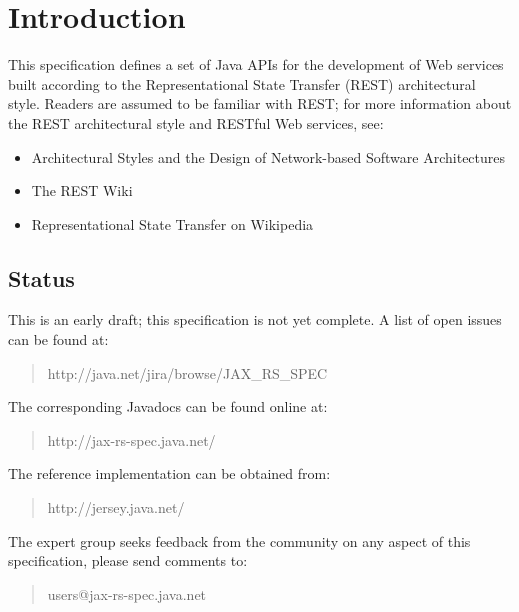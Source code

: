 \chapter{Introduction}

This specification defines a set of Java APIs for the development of Web services built according to the Representational State Transfer\cite{rest} (REST) architectural style. Readers are assumed to be familiar with 
REST; for more information about the REST architectural style and RESTful Web services, see:

\begin{itemize}
\item Architectural Styles and the Design of Network-based Software Architectures\cite{rest}
\item The REST Wiki\cite{restwiki}
\item Representational State Transfer on Wikipedia\cite{restwikipedia}
\end{itemize}

\section{Status}
\label{status}

This is an early draft; this specification is not yet complete. A list of open issues can be found at:

\begin{quote}
http://java.net/jira/browse/JAX\_RS\_SPEC
\end{quote}

The corresponding Javadocs can be found online at:

\begin{quote}
http://jax-rs-spec.java.net/
\end{quote}

The reference implementation can be obtained from:

\begin{quote}
http://jersey.java.net/
\end{quote}

The expert group seeks feedback from the community on any aspect of this specification, please send comments to:

\begin{quote}
users@jax-rs-spec.java.net
\end{quote}

